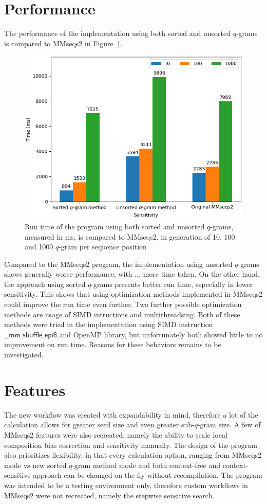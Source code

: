 \documentclass[twoside,a4paper,bsc]{master}
\newcommand{\Qgram}[1]{\(#1\)-gram}
\begin{document}
\section{Performance}
The performance of the implementation using both sorted and unsorted
\Qgram{q}s
is compared to MMseqs2 in Figure~\ref{fig:mmseqs2comp}.
\begin{figure}
\centering
\includegraphics[scale=0.6]{graphics/mmseqs2comp.png}
\caption{Run time of the program using both sorted and unsorted \Qgram{q}s,
measured in ms, is compared to MMseqs2, in generation of 10, 100 and 1000
\Qgram{q} per sequence position}
\label{fig:mmseqs2comp}
\end{figure}
Compared to the MMseqs2 program, the implementation using unsorted
\Qgram{q}s
shows generally worse performance, with ... more time taken. On the other
hand,
the approach using sorted \Qgram{q}s presents better run time, especially
in
lower sensitivity. This shows that using optimization methods implemented
in
MMseqs2 could improve the run time even further.
Two further possible optimization methods are usage of SIMD intructions and
multithreadsing. Both of these methods were tried in the implementation
using
SIMD instruction \(\mathsf{\_\_mm\_shuffle\_epi8}\) and OpenMP library, but
unfortunately both showed little to no improvement on run time. Reasons for
these behaviors remains to be investigated.
\section{Features}
The new workflow was created with expandability in mind, therefore a lot of
the calculation allows for greater seed size and even greater sub-\Qgram{q}
size. A few of MMseqs2 features were also recreated, namely the ability to
scale local composition bias correction and sensitivity manually. The
design of the program also prioritizes flexibility, in that every
calculation option, ranging from MMseqs2 mode vs new sorted \Qgram{q}
method mode and both context-free and context-sensitive approach can be
changed on-the-fly without recompilation.
The program was intended to be a testing environment only, therefore custom
workflows in MMseqs2 were not recreated, namely the stepwise sensitive
search.
\end{document}
